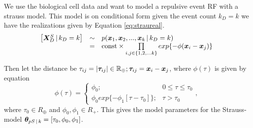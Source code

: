 \section{}
\label{sec:problem4}

We use the biological cell data and want to model a repulsive event RF with a strauss model. This model is on conditional form given the event count $k_D = k$ we have the realizations given by Equation \ref{eq:straureal}. 
\begin{equation}
    \begin{array}{rcl}
        \left[\bm{X}_D^S \, | \, k_D = k\right] & \sim & p(\bm{x}_1,\bm{x}_2,...,\bm{x}_k \, | \, k_D = k) \\
         & = & \mathrm{const} \times \prod\limits_{i,j\in \{1,2,...k\}} exp\{-\phi(\bm{x}_i-\bm{x}_j)\}
    \end{array}
    \label{eq:straureal}
\end{equation}

Then let the distance be $\tau_{ij} = |\bm{\tau}_{ij}| \in \mathbb{R}_\oplus; \bm{\tau}_{ij} = \bm{x}_i - \bm{x}_j$, where $\phi(\tau)$ is given by equation 
\begin{equation}
    \phi(\tau) = \begin{cases}
                    \phi_0; & 0 \leq \tau \leq \tau_0\\
                    \phi_0 exp\{-\phi_1[\tau-\tau_0]\}; & \tau > \tau_0
                \end{cases},
    \label{eq:interfunction}
\end{equation}
where $\tau_0 \in R_\oplus$ and $\phi_0,\phi_1 \in R_+$. This gives the model parameters for the Strauss-model $\bm{\theta} _{pS\, | \, k} = [\tau_0,\phi_0,\phi_1]$.